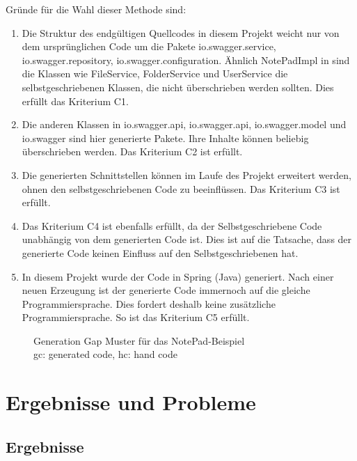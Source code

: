 \documentclass[a4paper,twoside]{article}
\begin{document}
	Gr\"unde f\"ur die Wahl dieser Methode sind:
	\begin{enumerate}
		\item Die Struktur des endg\"ultigen Quellcodes in diesem Projekt weicht nur von dem urspr\"unglichen Code um die Pakete io.swagger.service, io.swagger.repository, io.swagger.configuration. \"Ahnlich NotePadImpl in \cite{timo2015_3_1} sind die Klassen wie FileService, FolderService und UserService die selbstgeschriebenen Klassen, die nicht \"uberschrieben werden sollten. Dies erf\"ullt das Kriterium C1.
		
		\item Die anderen Klassen in io.swagger.api, io.swagger.api, io.swagger.model und io.swagger sind hier generierte Pakete. Ihre Inhalte k\"onnen beliebig \"uberschrieben werden. Das Kriterium C2 ist erf\"ullt.
		
		\item Die generierten Schnittstellen k\"onnen im Laufe des Projekt erweitert werden, ohnen den selbstgeschriebenen Code zu beeinfl\"ussen.  Das Kriterium C3 ist erf\"ullt.
		
		\item Das Kriterium C4 ist ebenfalls erf\"ullt, da der Selbstgeschriebene Code unabh\"angig von dem generierten Code ist. Dies ist auf die Tatsache, dass der generierte Code keinen Einfluss auf den Selbstgeschriebenen hat.
		
		\item In diesem Projekt wurde der Code in Spring (Java) generiert. Nach einer neuen Erzeugung ist der generierte Code immernoch auf die gleiche Programmiersprache. Dies fordert deshalb keine zus\"atzliche Programmiersprache. So ist das Kriterium C5 erf\"ullt.
	\end{enumerate}
	
	\begin{figure}[ht]
		\centering
		{}
		\caption{Generation Gap Muster f\"ur das NotePad-Beispiel\\ gc: generated code, hc: hand code}
		\label{fig:generation-gap-muster-fuer-das-notepad-beispiel}
	\end{figure}
	
	\section{Ergebnisse und Probleme}
	
	\subsection{Ergebnisse}
	
\end{document}
